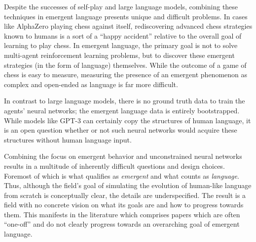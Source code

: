 Despite the successes of self-play and large language models, combining these techniques in emergent language presents unique and difficult problems.
In cases like AlphaZero playing chess against itself, rediscovering advanced chess strategies known to humans is a sort of a ``happy accident'' relative to the overall goal of learning to play chess.
In emergent language, the primary goal is not to solve multi-agent reinforcement learning problems, but to discover these emergent strategies (in the form of language) themselves.
While the outcome of a game of chess is easy to measure, measuring the presence of an emergent phenomenon as complex and open-ended as language is far more difficult.

In contrast to large language models,
    there is no ground truth data to train the agents' neural networks; the emergent language data is entirely bootstrapped.
While models like GPT-3 can certainly copy the structures of human language, it is an open question whether or not such neural networks would acquire these structures without human language input.

Combining the focus on emergent behavior and unconstrained neural networks results in a multitude of inherently difficult questions and design choices.
Foremost of which is what qualifies as \emph{emergent} and what counts as \emph{language}.
Thus, although the field's goal of simulating the evolution of human-like language from scratch is conceptually clear, the details are underspecified.
The result is a field with no concrete vision on what its goals are and how to progress towards them.
This manifests in the literature which comprises papers which are often ``one-off'' and do not clearly progress towards an overarching goal of emergent language.

